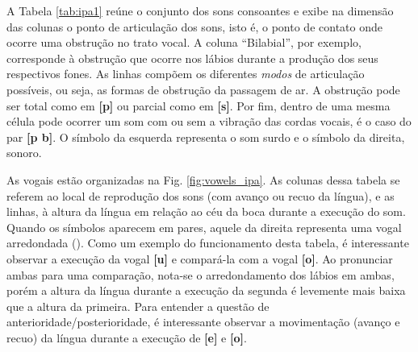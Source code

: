 A Tabela \ref{tab:ipa1} reúne o conjunto dos sons consoantes e exibe na dimensão das colunas o ponto de articulação dos sons, isto é, o ponto de contato onde ocorre uma obstrução no trato vocal. A coluna “Bilabial”, por exemplo, corresponde à obstrução que ocorre nos lábios durante a produção dos seus respectivos fones. As linhas compõem os diferentes \textit{modos} de articulação possíveis, ou seja, as formas de obstrução da passagem de ar. A obstrução pode ser total como em \textbf{[p]} ou parcial como em \textbf{[s]}. Por fim, dentro de uma mesma célula pode ocorrer um som com ou sem a vibração das cordas vocais, é o caso do par \textbf{[p b]}. O símbolo da esquerda representa o som surdo e o símbolo da direita, sonoro. 

As vogais estão organizadas na Fig. \ref{fig:vowels_ipa}. As colunas dessa tabela se referem ao local de reprodução dos sons (com avanço ou recuo da língua), e as linhas, à altura da língua em relação ao céu da boca durante a execução do som. Quando os símbolos aparecem em pares, aquele da direita representa uma vogal arredondada (\cite{paraconhecer:2015}). Como um exemplo do funcionamento desta tabela, é interessante observar a execução da vogal \textbf{[u]} e compará-la com a vogal \textbf{[o]}. Ao pronunciar ambas para uma comparação, nota-se o arredondamento dos lábios em ambas, porém a altura da língua durante a execução da segunda é levemente mais baixa que a altura da primeira. Para entender a questão de anterioridade/posterioridade, é interessante observar a movimentação (avanço e recuo) da língua durante a execução de \textbf{[e]} e \textbf{[o]}.


